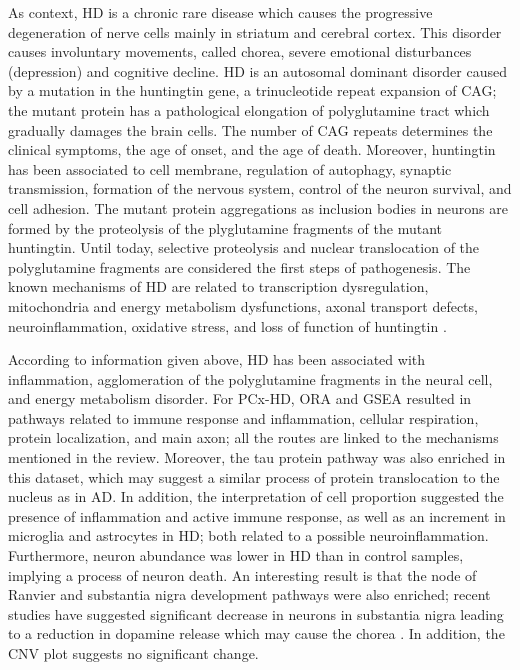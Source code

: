 As context, HD is a chronic rare disease which causes the progressive degeneration of nerve cells mainly in striatum and cerebral cortex. This disorder causes involuntary movements, called chorea, severe emotional disturbances (depression) and cognitive decline. HD is an autosomal dominant disorder caused by a mutation in the huntingtin gene, a trinucleotide repeat expansion of CAG; the mutant protein has a pathological elongation of polyglutamine tract which gradually damages the brain cells. The number of CAG repeats determines the clinical symptoms, the age of onset, and the age of death. Moreover, huntingtin has been associated to cell membrane, regulation of autophagy, synaptic transmission, formation of the nervous system, control of the neuron survival, and cell adhesion. The mutant protein aggregations as inclusion bodies in neurons are formed by the proteolysis of the plyglutamine fragments of the mutant huntingtin. Until today, selective proteolysis and nuclear translocation of the polyglutamine fragments are considered the first steps of pathogenesis. The known mechanisms of HD are related to transcription dysregulation, mitochondria and energy metabolism dysfunctions, axonal transport defects, neuroinflammation, oxidative stress, and loss of function of huntingtin \cite{illarioshkin}.

According to information given above, HD has been associated with inflammation, agglomeration of the polyglutamine fragments in the neural cell, and energy metabolism disorder. For PCx-HD, ORA and GSEA resulted in pathways related to immune response and inflammation, cellular respiration, protein localization, and main axon; all the routes are linked to the mechanisms mentioned in the review. Moreover, the tau protein pathway was also enriched in this dataset, which may suggest a similar process of protein translocation to the nucleus as in AD. In addition, the interpretation of cell proportion suggested the presence of inflammation and active immune response, as well as an increment in microglia and astrocytes in HD; both related to a possible neuroinflammation. Furthermore, neuron abundance was lower in HD than in control samples, implying a process of neuron death. An interesting result is that the node of Ranvier and substantia nigra development pathways were also enriched; recent studies have suggested significant decrease in neurons in substantia nigra leading to a reduction in dopamine release which may cause the chorea \cite{cepeda}. In addition, the CNV plot suggests no significant change.

